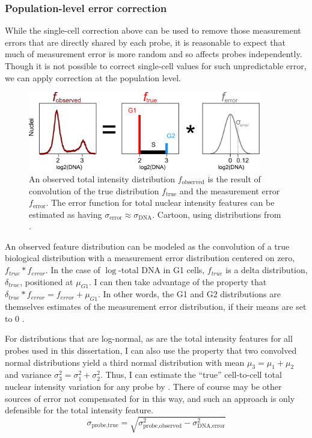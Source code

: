 \subsubsection{Population-level error correction}


While the single-cell correction above can be used to remove
those measurement errors that are directly shared by each probe,
it is reasonable to expect that much
of measurement error is more random and so affects probes independently. Though it is
not possible to correct single-cell values for such
unpredictable error, we can apply correction at the
population level.


  \begin{figure}[!bt]
  \centering
  \includegraphics[width=4in]{FIGS/imaging/convolution.pdf}
  {\singlespacing 
  \caption[ Estimating measurement error of the total intensity feature.]
            {An observed total intensity distribution $f_\text{observed}$
            is the result of convolution of the true distribution
            $f_\text{true}$ and the measurement error $f_\text{error}$.
            The error function for total nuclear intensity features
            can be estimated as having $\sigma_\text{error}\approx
            \sigma_\text{DNA}$.
            Cartoon, using distributions from .}
  \label{fig:imaging:convolution}}
  \end{figure}


An observed feature distribution can be modeled as the convolution
of a true biological distribution with a measurement error
distribution centered on zero, $f_{true}*f_{error}$. In the case of $\log$-total DNA
in G1 cells, $f_{true}$
is a delta distribution, $\delta_{true}$, positioned at $\mu_{G1}$.
I can then take advantage of
the property that $\delta_{true}*f_{error}=f_{error}+\mu_{G1}$.
In other words, the G1 and G2 distributions are themselves
estimates of the measurement error distribution, if their
means are set to 0
.


For distributions that are log-normal, as are the total
intensity features for all probes used in this dissertation,
I can also use the property that two convolved normal distributions
yield a third normal distribution with mean
$\mu_3=\mu_1+\mu_2$ and variance
$\sigma_3^2=\sigma_1^2+\sigma_2^2$.
Thus, I can estimate the ``true'' cell-to-cell
total nuclear intensity variation
for any probe by . There of course may
be other sources of error not compensated for in this way, and
such an approach is only defensible for the total intensity feature.
    \begin{equation} \label{eq:imaging:decon}
    \sigma_\text{probe,true} = \sqrt{ \sigma_\text{probe,observed}^2-\sigma_\text{DNA,error}^2 }
    \end{equation}

